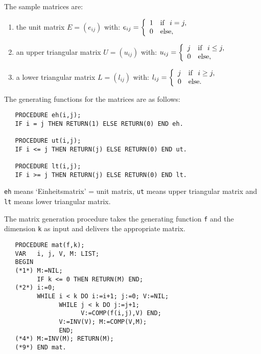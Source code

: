 The sample matrices are:
\begin{enumerate}
\item the unit matrix $E = ( e_{ij} )$ with:
      \begin{math}
             e_{ij} = \left\{
                       \begin{array}{ll}
                              1 & {\rm if} \ \  i = j, \\
                              0 & {\rm else},
                       \end{array}
                       \right.
      \end{math}
\item an upper triangular matrix $U = ( u_{ij} )$ with:
      \begin{math}
             u_{ij} = \left\{
                       \begin{array}{ll}
                              j & {\rm if} \ \ i \leq j, \\
                              0 & {\rm else},
                       \end{array}
                       \right.
      \end{math}
\item a lower triangular matrix $L = ( l_{ij} )$ with:
      \begin{math}
             l_{ij} = \left\{
                       \begin{array}{ll}
                              j & {\rm if} \ \ i \geq j, \\
                              0 & {\rm else}.
                       \end{array}
                       \right.
      \end{math}
\end{enumerate}

The generating functions for the matrices are as follows:
\begin{verbatim}
   PROCEDURE eh(i,j);
   IF i = j THEN RETURN(1) ELSE RETURN(0) END eh.

   PROCEDURE ut(i,j);
   IF i <= j THEN RETURN(j) ELSE RETURN(0) END ut.

   PROCEDURE lt(i,j);
   IF i >= j THEN RETURN(j) ELSE RETURN(0) END lt.
\end{verbatim}
\verb/eh/ means `Einheitsmatrix' = unit matrix,
\verb/ut/ means upper triangular matrix and
\verb/lt/ means lower triangular matrix.

The matrix generation procedure takes the 
generating function \verb/f/ and the dimension \verb/k/
as input and delivers the appropriate matrix. 
\begin{verbatim}
   PROCEDURE mat(f,k);
   VAR   i, j, V, M: LIST;
   BEGIN
   (*1*) M:=NIL;
         IF k <= 0 THEN RETURN(M) END;
   (*2*) i:=0;
         WHILE i < k DO i:=i+1; j:=0; V:=NIL; 
               WHILE j < k DO j:=j+1;
                     V:=COMP(f(i,j),V) END;
               V:=INV(V); M:=COMP(V,M);
               END;
   (*4*) M:=INV(M); RETURN(M);
   (*9*) END mat.
\end{verbatim}

